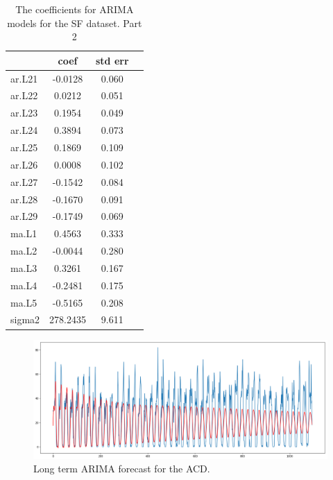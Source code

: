 \documentclass[12pt,a4paper]{article}
\theoremstyle{myplain}
\numberwithin{equation}{section}
\begin{document}
\begin{table}[h!]
\label{tab:table10}
\begin{center}
\begin{tabular}{|l|c|c|c|}
\hline
 & coef  &  std err \\
\hline
ar.L21    &    -0.0128     & 0.060 \\
\hline
ar.L22    &     0.0212    &  0.051 \\
\hline
ar.L23    &     0.1954   &   0.049 \\
\hline
ar.L24    &     0.3894  &    0.073 \\
\hline
ar.L25    &     0.1869     & 0.109 \\
\hline
ar.L26    &     0.0008    &  0.102 \\
\hline
ar.L27    &    -0.1542   &   0.084 \\
\hline
ar.L28    &    -0.1670     & 0.091 \\
\hline
ar.L29    &    -0.1749    &  0.069 \\
\hline
ma.L1     &    0.4563    &  0.333 \\
\hline
ma.L2     &    -0.0044  &    0.280 \\
\hline
ma.L3     &     0.3261 &     0.167 \\
\hline
ma.L4     &    -0.2481    &  0.175 \\
\hline
ma.L5     &    -0.5165    &  0.208 \\
\hline
sigma2    &    278.2435  &    9.611 \\
\hline
\end{tabular}
\end{center}
\caption{The coefficients for ARIMA models for the SF dataset. Part 2}
\end{table}

\newpage

\begin{figure}
\includegraphics[scale=0.36]{ACD_ARIMA_long_plot}
\caption{Long term ARIMA forecast for the ACD.}
\end{figure}
\end{document}
